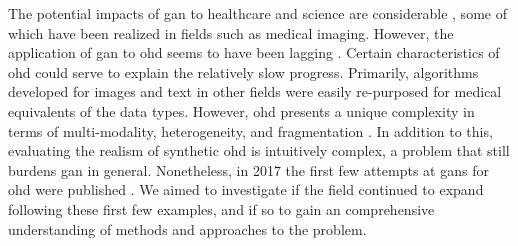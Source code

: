         The potential impacts of \gls{gan} to healthcare and science are considerable \cite{Rankin2020}, some of which have been realized in fields such as medical imaging. However, the application of \gls{gan} to \gls{ohd} seems to have been lagging \cite{Xiao_2018_chall}. Certain characteristics of \gls{ohd} could serve to explain the relatively slow progress. Primarily, algorithms developed for images and text in other fields were easily re-purposed for medical equivalents of the data types. However, \gls{ohd} presents a unique complexity in terms of multi-modality, heterogeneity, and fragmentation \cite{Xiao_2018_chall}. In addition to this, evaluating the realism of synthetic \gls{ohd} is intuitively complex, a problem that still burdens \gls{gan} in general. Nonetheless, in 2017 the first few attempts at \glspl{gan} for \gls{ohd} were published \cite{esteban2017real,Che_2017,Choi2017-nt,yahi2017generative}. We aimed to investigate if the field continued to expand following these first few examples, and if so to gain an comprehensive understanding of methods and approaches to the problem.